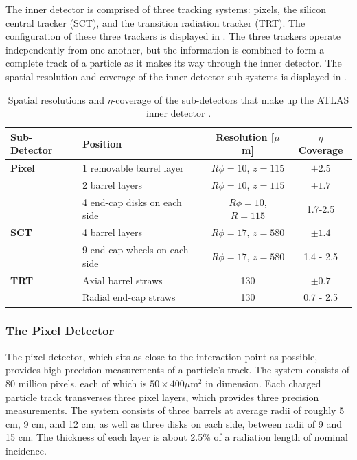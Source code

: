 The inner detector is comprised of three tracking systems: pixels,
the silicon central tracker (SCT), and the transition radiation tracker (TRT).
The configuration of these three trackers is displayed in .
The three trackers operate independently from one another, but the information
is combined to form a complete track of a particle as it makes its way
through the inner detector. The spatial resolution and coverage of the inner detector
sub-systems is displayed in .

\begin{table}[htbp]
  \begin{center}
    \begin{tabular}{|ll|cc|}
    \hline
    Sub-Detector & Position & Resolution [$\mu$m] & $\eta$ Coverage \\
    \hline
    \textbf{Pixel} & 1 removable barrel layer & $R\phi = 10$, $z = 115$ & $\pm 2.5$ \\
     & 2 barrel layers & $R\phi = 10$, $z = 115$ & $\pm1.7$ \\
     & 4 end-cap disks on each side & $R\phi = 10$, $R = 115$ & 1.7-2.5 \\
    \hline
    \textbf{SCT} & 4 barrel layers & $R\phi = 17$, $z = 580$ &  $\pm 1.4$ \\
     & 9 end-cap wheels on each side & $R\phi = 17$, $z = 580$  & 1.4 - 2.5 \\
    \hline
    \textbf{TRT} & Axial barrel straws & 130 & $\pm 0.7$ \\
     & Radial end-cap straws & 130 & 0.7 - 2.5 \\
    \hline
    \end{tabular}
    \caption{Spatial resolutions and $\eta$-coverage of the sub-detectors
    that make up the ATLAS inner detector \cite{Aad:2008zzm}.}
    \label{tab:spaceres}
  \end{center}
\end{table}

\subsubsection*{The Pixel Detector}
The pixel detector, which sits as close to the interaction point as possible,
provides high precision measurements of a particle's track. The system
consists of 80 million pixels,
each of which is $50 \times 400\mu\mathrm{m}^2$ in dimension. Each charged
particle track transverses three pixel layers, which provides three precision
measurements. The system consists of three barrels at average radii of roughly
5 cm, 9 cm, and 12 cm, 
as well as three disks on each side, between radii of 9 and 15 cm.
The thickness of each layer is about 2.5\% of a radiation length of
nominal incidence.

